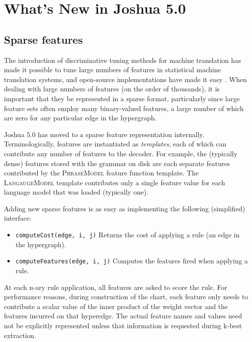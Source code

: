 \documentclass[11pt]{article}
\begin{document}
\section{What's New in Joshua 5.0}

\subsection{Sparse features}


The introduction of discriminative tuning methods for machine
translation \cite{liang2006end,chiang2008online,PRO2011} has made it
possible to tune large numbers of features in statistical machine
translation systems, and open-source implementations have made it easy
\cite{cherry2012batch}.  When dealing with large numbers of features
(on the order of thousands), it is important that they be represented
in a sparse format, particularly since large feature sets often employ
many binary-valued features, a large number of which are zero for any
particular edge in the hypergraph.

Joshua 5.0 has moved to a sparse feature representation
internally. Terminologically, features are instantiated as
\emph{templates}, each of which can contribute any number of features
to the decoder. For example, the (typically dense) features stored
with the grammar on disk are each separate features contributed by the
\textsc{PhraseModel} feature function template. The
\textsc{LangaugeModel} template contributes only a single feature
value for each language model that was loaded (typically one).

Adding new sparse features is as easy as implementing the following
(simplified) interface:
%
\begin{itemize}
\item \texttt{computeCost(edge, i, j)} Returns the cost of applying a
  rule (an edge in the hypergraph).
\item \texttt{computeFeatures(edge, i, j)} Computes the features fired
  when applying a rule.
\end{itemize}
%
At each n-ary rule application, all features are asked to score the
rule.  For performance reasons, during construction of the chart, each
feature only needs to contribute a scalar value of the inner product
of the weight vector and the features incurred on that hyperedge. The
actual feature names and values need not be explicitly represented
unless that information is requested during k-best extraction.
\end{document}
